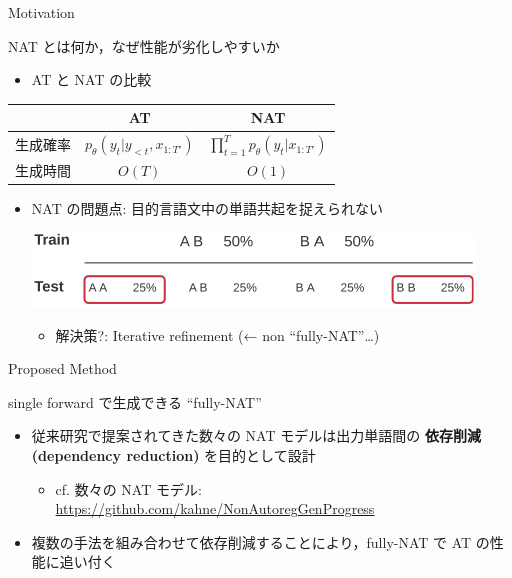 \documentclass[unicode, 12pt, xdvipdfmx, aspectratio=43]{beamer}
\begin{document}
\begin{frame}[label={sec:org90405f0}]{Motivation}
\begin{block}{NAT とは何か，なぜ性能が劣化しやすいか}
\begin{itemize}
\item AT と NAT の比較
\end{itemize}
\centering
\begin{tabular}{lcc} \toprule
  & AT & NAT \\\midrule
生成確率 & $p_\theta(y_t |  y_{<t}, x_{1:T'})$ & $\prod_{t=1}^T p_\theta(y_t  | x_{1:T'})$ \\
生成時間 & $O(T)$ & $O(1)$ \\
\bottomrule
\end{tabular}

\begin{itemize}
\item \small NAT の問題点: 目的言語文中の単語共起を捉えられない
\begin{center}
\includegraphics[width=0.7\linewidth]{./figure/Figure2.pdf}
\end{center}

\begin{itemize}
\item 解決策?: Iterative refinement (← non ``fully-NAT''\ldots{})
\end{itemize}
\end{itemize}
\end{block}
\end{frame}

\begin{frame}[label={sec:org69365c3}]{Proposed Method}
\begin{block}{single forward で生成できる ``fully-NAT''}
\begin{itemize}
\item 従来研究で提案されてきた数々の NAT モデルは出力単語間の \textbf{\alert{依存削減 (dependency reduction)}} を目的として設計
\begin{itemize}
\item cf. 数々の NAT モデル: \\
\scriptsize \url{https://github.com/kahne/NonAutoregGenProgress}
\end{itemize}
\item 複数の手法を組み合わせて\alert{依存削減}することにより，fully-NAT で AT の性能に追い付く
\end{itemize}
\end{block}
\end{frame}
\end{document}
